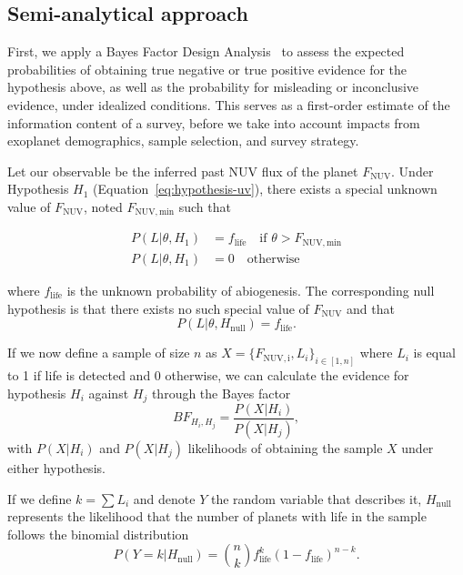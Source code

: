 \documentclass[twocolumn,twocolappendix,linenumbers]{aastex631}
\begin{document}
\subsection{Semi-analytical approach}\label{sec:met-semianalytical}
First, we apply a Bayes Factor Design Analysis~\citep{Schoenbrodt2018} to assess the expected probabilities of obtaining true negative or true positive evidence for the hypothesis above, as well as the probability for misleading or inconclusive evidence, under idealized conditions.
This serves as a first-order estimate of the information content of a survey, before we take into account impacts from exoplanet demographics, sample selection, and survey strategy.

Let our observable be the inferred past \gls{NUV} flux of the planet $F_\mathrm{NUV}$.
Under Hypothesis $H_1$ (Equation~\ref{eq:hypothesis-uv}), there exists a special unknown value of $F_\mathrm{NUV}$, noted $F_\mathrm{NUV, min}$ such that

\begin{align}
    P(L|\theta,H_1) &=  f_\mathrm{life} \quad \text{if } \theta>F_\mathrm{NUV, min}\\
    P(L|\theta,H_1) &=  0               \quad  \text{otherwise}
\end{align}

where $f_\mathrm{life}$ is the unknown probability of abiogenesis.
The corresponding null hypothesis is that there exists no such special value of $F_\mathrm{NUV}$ and that
\begin{equation}
P(L|\theta,H_\mathrm{null}) = f_\mathrm{life}.
\end{equation}

If we now define a sample of size $n$ as $X=\{F_\mathrm{NUV, i},L_i\}_{i \in [1,n]}$ where $L_i$ is equal to 1 if life is detected and 0 otherwise, we can calculate the evidence for hypothesis $H_i$ against $H_j$ through the Bayes factor
\begin{equation}
BF_{H_i,H_j} = \frac{P(X|H_i)}{P(X|H_j)},
\end{equation}
with $P(X|H_i)$ and $P(X|H_j)$ likelihoods of obtaining the sample $X$ under either hypothesis.

If we define $k=\sum L_i$ and denote $Y$ the random variable that describes it, $H_\mathrm{null}$ represents the likelihood that the number of planets with life in the sample follows the binomial distribution
\begin{equation}
P(Y=k|H_\mathrm{null}) = \binom{n}{k}f_\mathrm{life}^k(1-f_\mathrm{life})^{n-k}.
\end{equation}
\end{document}
